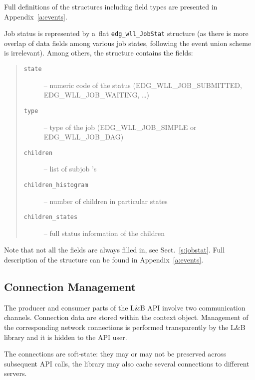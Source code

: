 \documentclass{egee}
\def\LB{L\&B\xspace}
\begin{document}
Full definitions of the structures including field types are presented
in Appendix~\ref{a:events}.

Job status is represented by a~flat \verb'edg_wll_JobStat' structure
(as there is more overlap of data fields among various job states,
following the event union scheme is irrelevant).
Among others, the structure contains the fields:
\def\ttitem[#1]{\item[\normalfont\texttt{#1}]}
\begin{quote}
\raggedright
\begin{description}
\ttitem[state] -- numeric code of the status (EDG\_WLL\_JOB\_SUBMITTED, EDG\_WLL\_JOB\_WAITING, \dots)
\ttitem[type] -- type of the job (EDG\_WLL\_JOB\_SIMPLE or EDG\_WLL\_JOB\_DAG)
\ttitem[children] -- list of subjob \jobid's
\ttitem[children\_histogram] -- number of children in particular states
\ttitem[children\_states] -- full status information of the children
\end{description}
\end{quote}
Note that not all the fields are always filled in, see Sect.~\ref{s:jobstat}.
Full description of the structure can be found in Appendix~\ref{a:events}.

\subsection{Connection Management}
The producer and consumer parts of the \LB API involve two communication
channels.
Connection data are stored within the context object.
Management of the corresponding network connections is performed 
transparently by the \LB
library and it is hidden to the API user.

The connections are soft-state: they may or may not be preserved across
subsequent API calls, the library may also cache several connections to
different servers.

\end{document}
